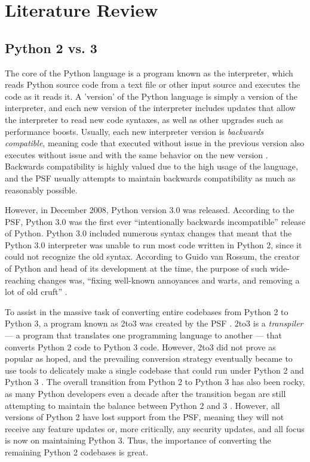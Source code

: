 \section{Literature Review}

\subsection{Python 2 vs. 3}
The core of the Python language is a program known as the interpreter, which reads Python source code from a text file or other input source and executes the code as it reads it. A 'version' of the Python language is simply a version of the interpreter, and each new version of the interpreter includes updates that allow the interpreter to read new code syntaxes, as well as other upgrades such as performance boosts. Usually, each new interpreter version is \textit{backwards compatible}, meaning code that executed without issue in the previous version also executes without issue and with the same behavior on the new version \autocite{Malloy}. Backwards compatibility is highly valued due to the high usage of the language, and the PSF usually attempts to maintain backwards compatibility as much as reasonably possible.

However, in December 2008, Python version 3.0 was released. According to the PSF, Python 3.0 was the first ever “intentionally backwards incompatible” release of Python. Python 3.0 included numerous syntax changes that meant that the Python 3.0 interpreter was unable to run most code written in Python 2, since it could not recognize the old syntax. According to Guido van Rossum, the creator of Python and head of its development at the time, the purpose of such wide-reaching changes was, “fixing well-known annoyances and warts, and removing a lot of old cruft” \autocite{vanRossum}.

To assist in the massive task of converting entire codebases from Python 2 to Python 3, a program known as 2to3 was created by the PSF \autocite{2to3}. 2to3 is a \textit{transpiler} --- a program that translates one programming language to another --- that converts Python 2 code to Python 3 code. However, 2to3 did not prove as popular as hoped, and the prevailing conversion strategy eventually became to use tools to delicately make a single codebase that could run under Python 2 and Python 3 \autocite{Malloy}. The overall transition from Python 2 to Python 3 has also been rocky, as many Python developers even a decade after the transition began are still attempting to maintain the balance between Python 2 and 3 \autocite{Malloy}. However, all versions of Python 2 have lost support from the PSF, meaning they will not receive any feature updates or, more critically, any security updates, and all focus is now on maintaining Python 3. Thus, the importance of converting the remaining Python 2 codebases is great.

